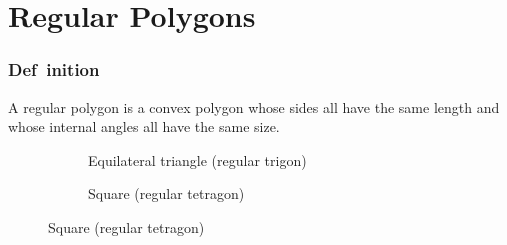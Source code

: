 \documentclass[aspectratio=169,11pt,svgnames,draft]{beamer}
\begin{document}
\section{Regular Polygons}

\begin{frame}
 \frametitle{Def~\hspace*{-.4ex}inition}
 \begin{tcolorbox}[title=Regular Polygon]
  A \alert{regular polygon} is a convex polygon whose sides all have the same
  length and whose internal angles all have the same size.
 \end{tcolorbox}
 \begin{figure}[H]
  \centering
  \begin{subfigure}[t]{.24\textwidth}
   \centering
   \caption*{Equilateral triangle (regular trigon)}
  \end{subfigure}
  \begin{subfigure}[t]{.24\textwidth}
   \centering
   \caption*{Square (regular tetragon)}
  \end{subfigure}
 \end{figure}
\end{frame}
\end{document}
